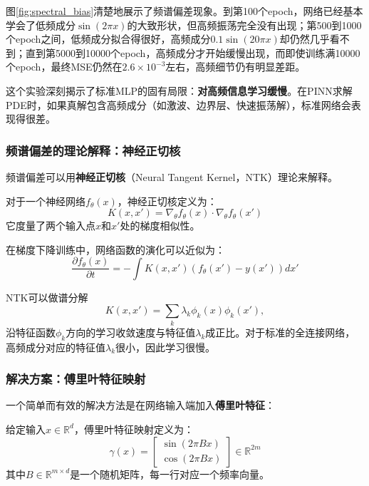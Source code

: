 图\ref{fig:spectral_bias}清楚地展示了频谱偏差现象。到第100个epoch，网络已经基本学会了低频成分$\sin(2\pi x)$的大致形状，但高频振荡完全没有出现；第500到1000个epoch之间，低频成分拟合得很好，高频成分$0.1\sin(20\pi x)$却仍然几乎看不到；直到第5000到10000个epoch，高频成分才开始缓慢出现，而即使训练满10000个epoch，最终MSE仍然在$2.6 \times 10^{-3}$左右，高频细节仍有明显差距。

这个实验深刻揭示了标准MLP的固有局限：\textbf{对高频信息学习缓慢}。在PINN求解PDE时，如果真解包含高频成分（如激波、边界层、快速振荡解），标准网络会表现得很差。

\subsubsection{频谱偏差的理论解释：神经正切核}

频谱偏差可以用\textbf{神经正切核}（Neural Tangent Kernel，NTK）理论来解释。

\begin{definition}[神经正切核]
对于一个神经网络$f_\theta(x)$，神经正切核定义为：
\begin{equation}
    K(x, x') = \nabla_\theta f_\theta(x) \cdot \nabla_\theta f_\theta(x')
\end{equation}
它度量了两个输入点$x$和$x'$处的梯度相似性。
\end{definition}

在梯度下降训练中，网络函数的演化可以近似为：
\begin{equation}
    \frac{\partial f_\theta(x)}{\partial t} = -\int K(x, x') \left( f_\theta(x') - y(x') \right) dx'
\end{equation}

\begin{proposition}[频谱偏差的NTK解释]
NTK可以做谱分解
\begin{equation*}
    K(x, x') = \sum_k \lambda_k \phi_k(x) \phi_k(x'),
\end{equation*}
沿特征函数$\phi_k$方向的学习收敛速度与特征值$\lambda_k$成正比。对于标准的全连接网络，高频成分对应的特征值$\lambda_k$很小，因此学习很慢。
\end{proposition}

\subsubsection{解决方案：傅里叶特征映射}

一个简单而有效的解决方法是在网络输入端加入\textbf{傅里叶特征}：

\begin{definition}[傅里叶特征映射]
给定输入$x \in \mathbb{R}^d$，傅里叶特征映射定义为：
\begin{equation}
    \gamma(x) = \begin{bmatrix} \sin(2\pi B x) \\ \cos(2\pi B x) \end{bmatrix} \in \mathbb{R}^{2m}
\end{equation}
其中$B \in \mathbb{R}^{m \times d}$是一个随机矩阵，每一行对应一个频率向量。
\end{definition}

